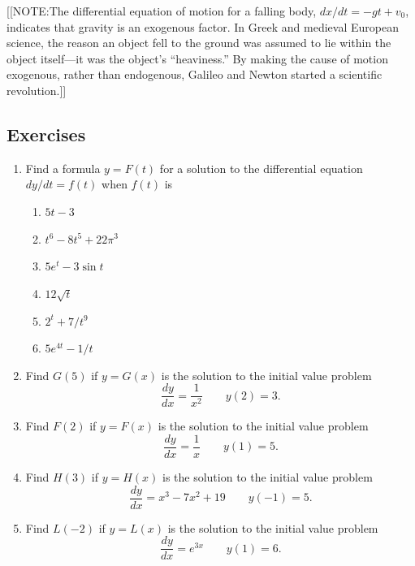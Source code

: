 [[NOTE:The differential equation of motion for a falling body, $dx/dt
  = -gt + v_0$, indicates that gravity is an exogenous factor.  In
  Greek and medieval European science, the reason an object fell to
  the ground was assumed to lie within the object itself---it was the
  object's ``heaviness.''  By making the cause of motion exogenous,
  rather than endogenous, Galileo and Newton started a scientific
  revolution.]]

\subsection{Exercises}
\label{subsec:exercises}




\begin{enumerate}
\item Find a formula $y = F(t)$ for a solution to the differential
equation $dy/dt = f(t)$ when $f(t)$ is




  \begin{enumerate}
  \item $5t - 3$


  \item $t^6 - 8t^5 + 22\pi^3$


  \item $5e^t - 3\sin{t}$


  \item $12\sqrt{t}$


  \item $2^t + 7/t^9$

  \item $5e^{4t}-1/t$


\end{enumerate}
\item Find $G(5)$ if $y = G(x)$ is the solution to the initial value problem
        \[
\dfrac{dy}{dx} = \dfrac{1}{x^2} \qquad y(2) = 3.
\]


\item Find $F(2)$ if $y = F(x)$ is the solution to the initial value problem
        \[
\dfrac{dy}{dx} = \dfrac{1}{x} \qquad y(1) = 5.
\]


\item Find $H(3)$ if $y = H(x)$ is the solution to the initial value problem
        \[
\dfrac{dy}{dx} = x^3-7x^2+19 \qquad y(-1) = 5.
\]


\item Find $L(-2)$ if $y = L(x)$ is the solution to the initial value problem
        \[
\dfrac{dy}{dx} = e^{3x} \qquad y(1) = 6.
\]



\end{enumerate}
